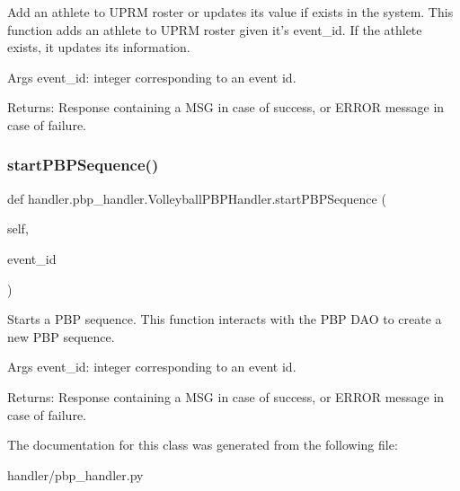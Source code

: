\begin{DoxyVerb}Add an athlete to UPRM roster or updates its value if exists in the system.
This function adds an athlete to UPRM roster given it's event_id.
If the athlete exists, it updates its information.

Args
    event_id: integer corresponding to an event id.

Returns:
    Response containing a MSG in case of success, or ERROR message in case of failure.
\end{DoxyVerb}
 \mbox{\label{classhandler_1_1pbp__handler_1_1_volleyball_p_b_p_handler_a728bf0cbfec68f2590d87e1b51c80d17}} 
\subsubsection{\texorpdfstring{start\+P\+B\+P\+Sequence()}{startPBPSequence()}}
{\footnotesize\ttfamily def handler.\+pbp\+\_\+handler.\+Volleyball\+P\+B\+P\+Handler.\+start\+P\+B\+P\+Sequence (\begin{DoxyParamCaption}\item[{}]{self,  }\item[{}]{event\+\_\+id }\end{DoxyParamCaption})}

\begin{DoxyVerb}Starts a PBP sequence.
This function interacts with the PBP DAO to create a new PBP sequence.

Args
    event_id: integer corresponding to an event id.

Returns:
    Response containing a MSG in case of success, or ERROR message in case of failure.
\end{DoxyVerb}
 

The documentation for this class was generated from the following file\+:\begin{DoxyCompactItemize}
\item 
handler/pbp\+\_\+handler.\+py\end{DoxyCompactItemize}
